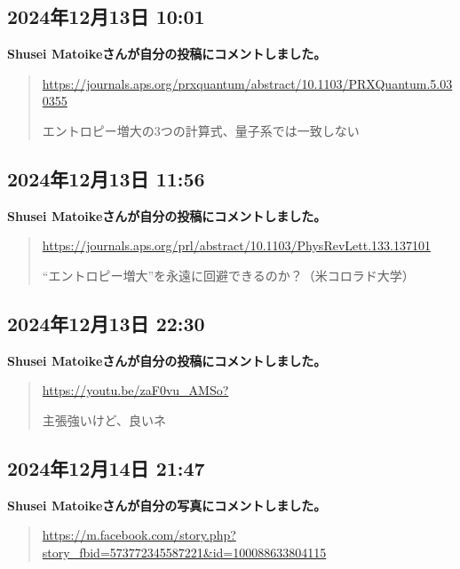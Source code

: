\subsection*{2024年12月13日 10:01}

\textbf{Shusei Matoikeさんが自分の投稿にコメントしました。}

\begin{quote}
\url{https://journals.aps.org/prxquantum/abstract/10.1103/PRXQuantum.5.030355}

エントロピー増大の3つの計算式、量子系では一致しない
\end{quote}

\subsection*{2024年12月13日 11:56}

\textbf{Shusei Matoikeさんが自分の投稿にコメントしました。}

\begin{quote}
\url{https://journals.aps.org/prl/abstract/10.1103/PhysRevLett.133.137101}

“エントロピー増大”を永遠に回避できるのか？（米コロラド大学）
\end{quote}

\subsection*{2024年12月13日 22:30}

\textbf{Shusei Matoikeさんが自分の投稿にコメントしました。}

\begin{quote}
\url{https://youtu.be/zaF0vu_AMSo?}

主張強いけど、良いネ
\end{quote}

\subsection*{2024年12月14日 21:47}

\textbf{Shusei Matoikeさんが自分の写真にコメントしました。}

\begin{quote}
\url{https://m.facebook.com/story.php?story_fbid=573772345587221&id=100088633804115}
\end{quote}

